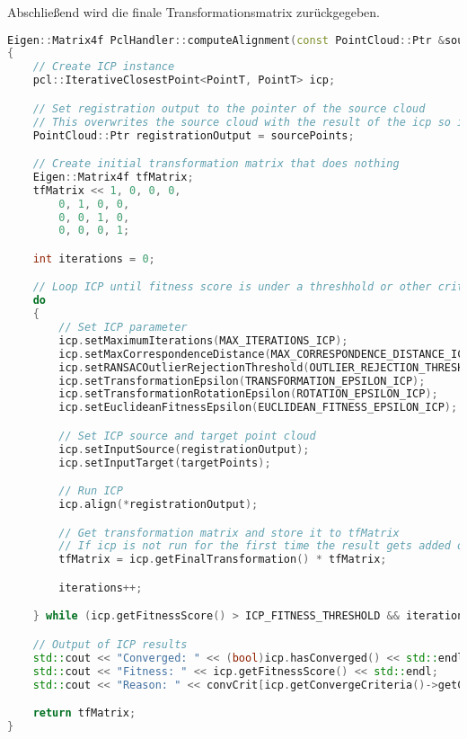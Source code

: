 Abschließend wird die finale Transformationsmatrix zurückgegeben.

\begin{lstlisting}[caption={Implementierung des \ac{icp}-Algorithmus},label={lst:icp},language={C++}]
Eigen::Matrix4f PclHandler::computeAlignment(const PointCloud::Ptr &sourcePoints, const PointCloud::Ptr &targetPoints)
{
    // Create ICP instance
    pcl::IterativeClosestPoint<PointT, PointT> icp;

    // Set registration output to the pointer of the source cloud
    // This overwrites the source cloud with the result of the icp so it can be used for another iteration
    PointCloud::Ptr registrationOutput = sourcePoints;

    // Create initial transformation matrix that does nothing
    Eigen::Matrix4f tfMatrix;
    tfMatrix << 1, 0, 0, 0,
        0, 1, 0, 0,
        0, 0, 1, 0,
        0, 0, 0, 1;

    int iterations = 0;

    // Loop ICP until fitness score is under a threshhold or other criteria is met
    do
    {
        // Set ICP parameter
        icp.setMaximumIterations(MAX_ITERATIONS_ICP);
        icp.setMaxCorrespondenceDistance(MAX_CORRESPONDENCE_DISTANCE_ICP - (iterations * 20));
        icp.setRANSACOutlierRejectionThreshold(OUTLIER_REJECTION_THRESHOLD_ICP);
        icp.setTransformationEpsilon(TRANSFORMATION_EPSILON_ICP);
        icp.setTransformationRotationEpsilon(ROTATION_EPSILON_ICP);
        icp.setEuclideanFitnessEpsilon(EUCLIDEAN_FITNESS_EPSILON_ICP);

        // Set ICP source and target point cloud
        icp.setInputSource(registrationOutput);
        icp.setInputTarget(targetPoints);

        // Run ICP
        icp.align(*registrationOutput);

        // Get transformation matrix and store it to tfMatrix
        // If icp is not run for the first time the result gets added onto the results from previous iterations
        tfMatrix = icp.getFinalTransformation() * tfMatrix;

        iterations++; 

    } while (icp.getFitnessScore() > ICP_FITNESS_THRESHOLD && iterations < ICP_MAX_NR_CORRECTIONS);

    // Output of ICP results
    std::cout << "Converged: " << (bool)icp.hasConverged() << std::endl;
    std::cout << "Fitness: " << icp.getFitnessScore() << std::endl;
    std::cout << "Reason: " << convCrit[icp.getConvergeCriteria()->getConvergenceState()] << std::endl;

    return tfMatrix;
} 
\end{lstlisting}

